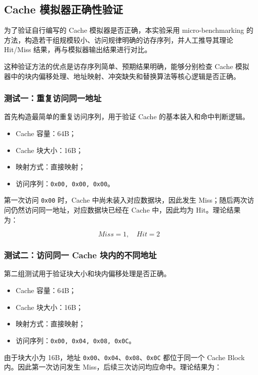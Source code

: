 \subsection{Cache 模拟器正确性验证}

为了验证自行编写的 Cache 模拟器是否正确，本实验采用 micro-benchmarking 的方法，构造若干组规模较小、访问规律明确的访存序列，并人工推导其理论 Hit/Miss 结果，再与模拟器输出结果进行对比。

这种验证方法的优点是访存序列简单、预期结果明确，能够分别检查 Cache 模拟器中的块内偏移处理、地址映射、冲突缺失和替换算法等核心逻辑是否正确。

\subsubsection{测试一：重复访问同一地址}

首先构造最简单的重复访问序列，用于验证 Cache 的基本装入和命中判断逻辑。

\begin{itemize}
    \item Cache 容量：64B；
    \item Cache 块大小：16B；
    \item 映射方式：直接映射；
    \item 访问序列：\texttt{0x00, 0x00, 0x00}。
\end{itemize}

第一次访问 \texttt{0x00} 时，Cache 中尚未装入对应数据块，因此发生 Miss；随后两次访问仍然访问同一地址，对应数据块已经在 Cache 中，因此均为 Hit。理论结果为：

\[
Miss = 1,\quad Hit = 2
\]

\subsubsection{测试二：访问同一 Cache 块内的不同地址}

第二组测试用于验证块大小和块内偏移处理是否正确。

\begin{itemize}
    \item Cache 容量：64B；
    \item Cache 块大小：16B；
    \item 映射方式：直接映射；
    \item 访问序列：\texttt{0x00, 0x04, 0x08, 0x0C}。
\end{itemize}

由于块大小为 16B，地址 \texttt{0x00}、\texttt{0x04}、\texttt{0x08}、\texttt{0x0C} 都位于同一个 Cache Block 内。因此第一次访问发生 Miss，后续三次访问均应命中。理论结果为：

